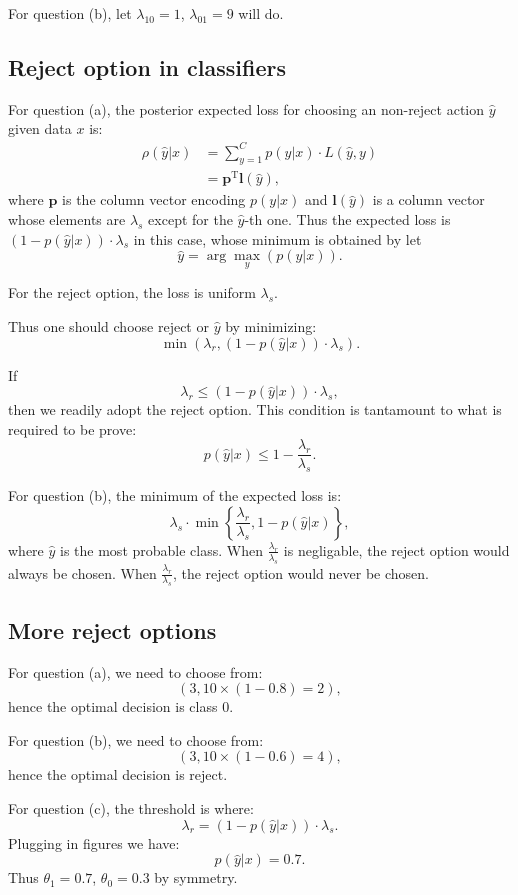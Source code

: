 \documentclass[UTF8]{ctexart}
\begin{document}
For question (b), let $\lambda_{10}=1$, $\lambda_{01}=9$ will do.

\subsection{Reject option in classifiers}
For question (a), the posterior expected loss for choosing an non-reject action $\hat{y}$ given data $x$ is:
$$
\begin{aligned}
\rho(\hat{y}|x)&=\sum_{y=1}^{C} p(y|x)\cdot L(\hat{y},y)\\
&=\textbf{p}^{\text{T}}\textbf{l}(\hat{y}),
\end{aligned}
$$
where $\textbf{p}$ is the column vector encoding $p(y|x)$ and $\textbf{l}(\hat{y})$ is a column vector whose elements are $\lambda_{s}$ except for the $\hat{y}$-th one.
Thus the expected loss is $(1-p(\hat{y}|x))\cdot\lambda_{s}$ in this case, whose minimum is obtained by let
$$\hat{y}=\arg\max_{y}(p(y|x)).$$

For the reject option, the loss is uniform $\lambda_{s}$.

Thus one should choose reject or $\hat{y}$ by minimizing:
$$\min (\lambda_{r},(1-p(\hat{y}|x))\cdot \lambda_{s}).$$

If
$$\lambda_{r}\leq (1-p(\hat{y}|x))\cdot\lambda_{s},$$
then we readily adopt the reject option.
This condition is tantamount to what is required to be prove:
$$p(\hat{y}|x)\leq 1-\frac{\lambda_{r}}{\lambda_{s}}.$$

For question (b), the minimum of the expected loss is:
$$\lambda_{s}\cdot \min\left\{\frac{\lambda_{r}}{\lambda_{s}},1-p(\hat{y}|x) \right\},$$
where $\hat{y}$ is the most probable class.
When $\frac{\lambda_{r}}{\lambda_{s}}$ is negligable, the reject option would always be chosen.
When $\frac{\lambda_{r}}{\lambda_{s}}$, the reject option would never be chosen.


\subsection{More reject options}
For question (a), we need to choose from:
$$(3,10\times (1-0.8)=2),$$
hence the optimal decision is class $0$.

For question (b), we need to choose from:
$$(3,10\times (1-0.6)=4),$$
hence the optimal decision is reject.

For question (c), the threshold is where:
$$\lambda_{r}=(1-p(\hat{y}|x))\cdot \lambda_{s}.$$
Plugging in figures we have:
$$p(\hat{y}|x)=0.7.$$
Thus $\theta_{1}=0.7$, $\theta_{0}=0.3$ by symmetry.
\end{document}
